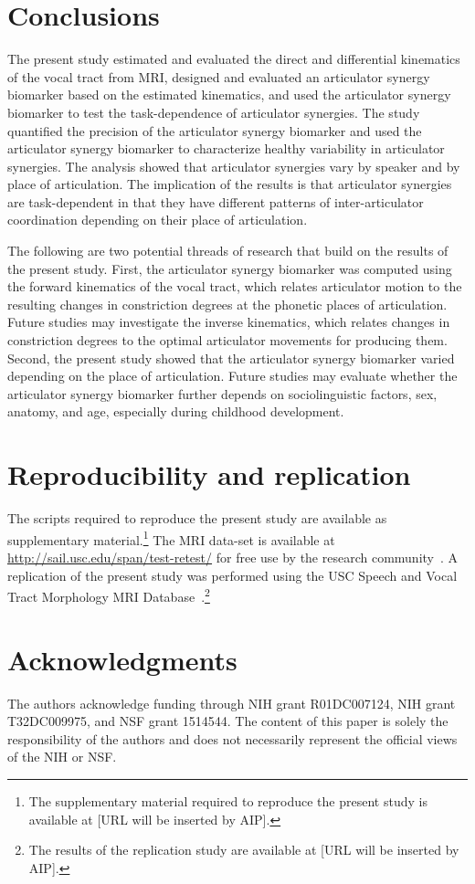 \documentclass[preprint]{JASAnew}\usepackage[]{graphicx}\usepackage[]{color}
\begin{document}
\section{Conclusions}

The present study estimated and evaluated the direct and differential kinematics of the vocal tract from MRI, 
%
designed and evaluated an articulator synergy biomarker based on the estimated kinematics, and
%
used the articulator synergy biomarker to test the task-dependence of articulator synergies.
%
The study quantified the precision of the articulator synergy biomarker and used the articulator synergy biomarker to characterize healthy variability in articulator synergies. 
%
The analysis showed that articulator synergies vary by speaker and by place of articulation. 
%
The implication of the results is that articulator synergies are task-dependent in that they have different patterns of inter-articulator coordination depending on their place of articulation. 



The following are two potential threads of research that build on the results of the present study.
First, the articulator synergy biomarker was computed using the forward kinematics of the vocal tract, which relates articulator motion to the resulting changes in constriction degrees at the phonetic places of articulation. Future studies may investigate the inverse kinematics, which relates changes in constriction degrees to the optimal articulator movements for producing them. 
%
Second, the present study showed that the articulator synergy biomarker varied depending on the place of articulation. Future studies may evaluate whether the articulator synergy biomarker further depends on sociolinguistic factors, sex, anatomy, and age, especially during childhood development.

\section{Reproducibility and replication}

The scripts required to reproduce the present study are available as supplementary material.\footnote{The supplementary material required to reproduce the present study is available at [URL will be inserted by AIP].}
%
The MRI data-set is available at \url{http://sail.usc.edu/span/test-retest/} for free use by the research community~\citep[see][]{toger2017test}.
%
A replication of the present study was performed using the USC Speech and Vocal Tract Morphology MRI Database~\citep{sorensen2017database}.\footnote{The results of the replication study are available at [URL will be inserted by AIP].}

\section{Acknowledgments} 

The authors acknowledge funding through NIH grant R01DC007124, NIH grant T32DC009975, and NSF grant 1514544. The content of this paper is solely the responsibility of the authors and does not necessarily represent the official views of the NIH or NSF.


\end{document}
